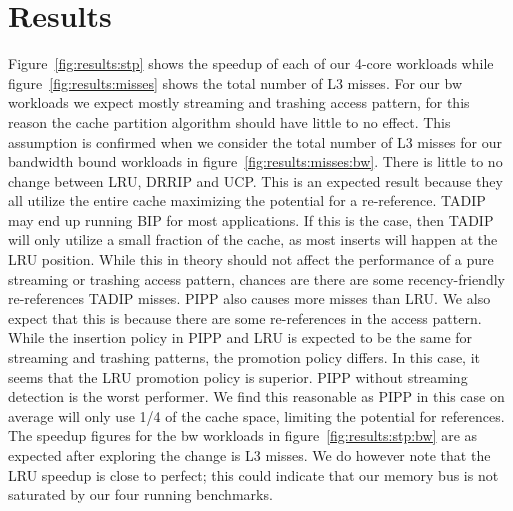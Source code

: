 
\chapter{Results}
\label{cpt:results}




Figure~\ref{fig:results:stp} shows the speedup of each of our 4-core workloads while figure~\ref{fig:results:misses} shows the total number of L3 misses.
For our bw workloads we expect mostly streaming and trashing access pattern, for this reason the cache partition algorithm should have little to no effect.
This assumption is confirmed when we consider the total number of L3 misses for our bandwidth bound workloads in figure~\ref{fig:results:misses:bw}.
There is little to no change between LRU, DRRIP and UCP. 
This is an expected result because they all utilize the entire cache maximizing the potential for a re-reference.
TADIP may end up running BIP for most applications. 
If this is the case, then TADIP will only utilize a small fraction of the cache, as most inserts will happen at the LRU position.
While this in theory should not affect the performance of a pure streaming or trashing access pattern, chances are there are some recency-friendly re-references TADIP misses.
PIPP also causes more misses than LRU.
We also expect that this is because there are some re-references in the access pattern. 
While the insertion policy in PIPP and LRU is expected to be the same for streaming and trashing patterns, the promotion policy differs. 
In this case, it seems that the LRU promotion policy is superior.
PIPP without streaming detection is the worst performer.
We find this reasonable as PIPP in this case on average will only use 1/4 of the cache space, limiting the potential for references.
The speedup figures for the bw workloads in figure~\ref{fig:results:stp:bw} are as expected after exploring the change is L3 misses.
We do however note that the LRU speedup is close to perfect; this could indicate that our memory bus is not saturated by our four running benchmarks.

